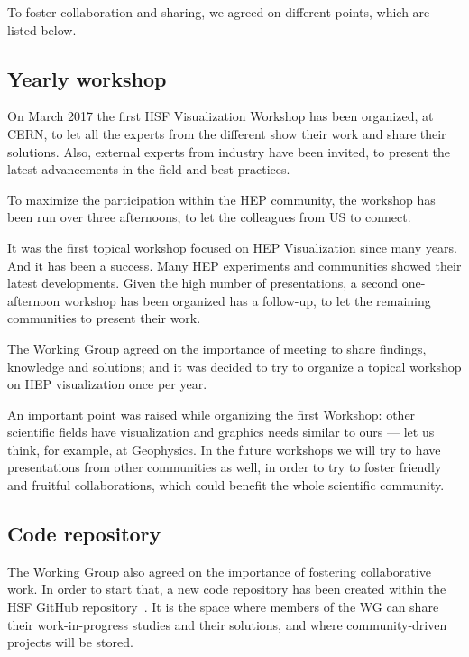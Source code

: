\documentclass[12pt,a4paper]{article}
\begin{document}
To foster collaboration and sharing, we agreed on different points, which are listed below.

\hypertarget{workshop}{%
\subsection{Yearly workshop}\label{workshop}}

On March 2017 the first HSF Visualization Workshop has been organized, at CERN, to let all the experts from the different
show their work and share their solutions. Also, external experts from industry have been invited, to present the latest
advancements in the field and best practices.

To maximize the participation within the HEP community, the workshop has been run over three afternoons, to let the
colleagues from US to connect.

It was the first topical workshop focused on HEP Visualization since many years. And it has been a success. Many HEP
experiments and communities showed their latest developments. Given the high number of presentations, a second one-afternoon
workshop has been organized has a follow-up, to let the remaining communities to present their work.

The Working Group agreed on the importance of meeting to share findings, knowledge and solutions; and it was decided to
try to organize a topical workshop on HEP visualization once per year.

An important point was raised while organizing the first Workshop: other scientific fields have visualization and
graphics needs similar to ours --- let us think, for example, at Geophysics. In the future workshops we will try to
have presentations from other communities as well, in order to try to foster friendly and fruitful collaborations,
which could benefit the whole scientific community.

\hypertarget{repo}{%
\subsection{Code repository}\label{repo}}

The Working Group also agreed on the importance of fostering collaborative work.
In order to start that, a new code repository has been created within the HSF GitHub repository~\cite{HSFVizRepo}.
It is the space where members of the WG can share their work-in-progress studies and their solutions, and where
community-driven projects will be stored.
\end{document}
